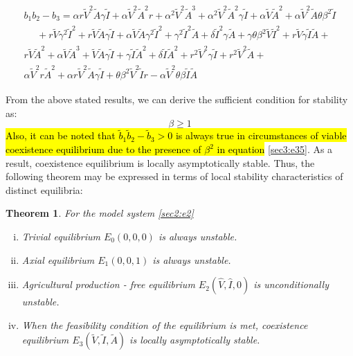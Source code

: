 \documentclass[12pt]{article}
\newtheorem{theorem}{Theorem}[section]
\numberwithin{equation}{section}
\begin{document}
\begin{enumerate}[i).]
\begin{equation}\label{sec3:e35}
\begin{split}
b_1b_2-b_3=\alpha r \tilde V^2 \tilde A \gamma \tilde I + \alpha \tilde V^2 \tilde A^2 r + \alpha^2 \tilde V^2 \tilde A^3 + \alpha^2\tilde V^2\tilde A^2\gamma \tilde I + \alpha \tilde V \tilde A^2 + \alpha \tilde V^2 \tilde A \theta \beta^2\tilde I \\
~~~~~~+ r\tilde V \gamma^2\tilde I^2 + r\tilde V\tilde A\gamma\tilde I+ \alpha \tilde V\tilde A\gamma^2\tilde I^2 + \gamma^2\tilde I^2\tilde A+\delta  \tilde I^2\gamma \tilde A
+\gamma \theta \beta^2 \tilde V \tilde I^2+ r\tilde V\gamma\tilde I \tilde A +\\
r\tilde V \tilde A^2 + \alpha \tilde V\tilde A^3+\tilde V\tilde A\gamma \tilde I+\gamma \tilde I \tilde A^2 +\delta \tilde I \tilde A^2 +r^2\tilde V^2\gamma\tilde I+r^2\tilde V^2\tilde A+\\
\alpha \tilde V^2 r \tilde A^2 + \alpha r \tilde V^2 \tilde A \gamma \tilde I+ \theta \beta^2 \tilde V^2 \tilde I r -\alpha\tilde V^2 \theta \beta \tilde I \tilde A
\end{split}
\end{equation}
\end{enumerate}

From the above stated results, we can derive the sufficient condition for stability as:
\begin{equation}\label{sec3:e36}
\beta \geq 1
\end{equation} 
\hl{Also, it can be noted that $\tilde b_1\tilde b_2-\tilde b_3>0$ is always true in circumstances of viable coexistence equilibrium due to the presence of $\beta^2$ in equation} \eqref{sec3:e35}. As a result, coexistence equilibrium is locally asymptotically stable.
Thus, the following theorem may be expressed in terms of local stability characteristics of distinct equilibria:
\begin{theorem}\label{Theorem 3.4}
For the model system \eqref{sec2:e2}
\begin{enumerate}[i)]
\item Trivial equilibrium $E_0(0,0,0)$ is always unstable.
\item Axial equilibrium $E_1(0,0,1)$ is always unstable.
\item Agricultural production - free equilibrium $E_2(\hat V,\hat I,0)$ is unconditionally unstable.
\item When the feasibility condition of the equilibrium is met, coexistence equilibrium $E_3(\tilde V,\tilde I,\tilde A)$ is locally asymptotically stable.
\end{enumerate}
 \end{theorem}
\end{document}
